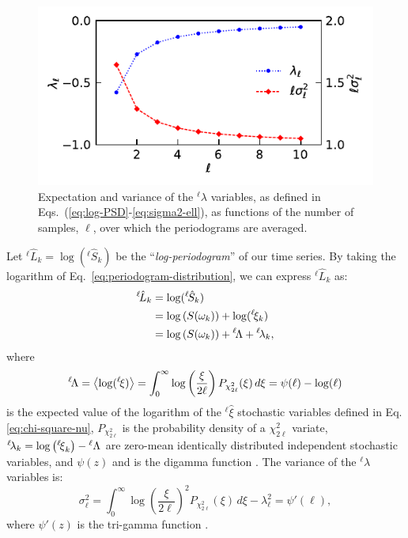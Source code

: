 \begin{figure}
    \centering
    \includegraphics[]{chapters/chapter5/figures/polygamma.pdf}
    \caption{Expectation and variance of the $^{\ell}\lambda$ variables, as defined in Eqs.~(\ref{eq:log-PSD}-\ref{eq:sigma2-ell}), as functions of the number of samples, $\ell$, over which the periodograms are averaged.}
    \label{fig:polygamma}
\end{figure}

Let $^{{\ell\!}}\hat{L}_{k} = \log(^{\ell\!}\hat{S}_{k})$ be the ``\emph{log-periodogram}'' of our time series. By taking the logarithm of Eq.~\eqref{eq:periodogram-distribution}, we can express $^{\ell\!}\hat{L}_{k}$ as:
\begin{align}
    ^{{\ell\!}}\hat{L}_{k} &= \log (^{\ell\!}\hat{S}_{k} ) \nonumber\\
    &= \log\left(S(\omega_k) \right) + \log( ^{\ell\!}{\xi}_k) \nonumber\\
    &= \log\left(S(\omega_k) \right) + {^{\ell\!}\rLambda} + {^{\ell\!}{\lambda}}_{k},  \label{eq:log-PSD}
\end{align}
where
\begin{equation}
    {^{\ell\!}\rLambda} = \left\langle \log( {^{\ell\!}{\xi}}) \right\rangle = \int_0^\infty \log\left (\frac{\xi}{2\ell}\right ) P_{\chi^2_{2\ell}}(\xi) \, d\xi = \psi(\ell)-\log(\ell) \label{eq:lambda-ell}
\end{equation}
is the expected value of the logarithm of the ${^\ell}\hat\xi$ stochastic variables defined in Eq. \eqref{eq:chi-square-nu}, $P_{\chi^2_{2\ell}}$ is the probability density of a $\chi^2_{2\ell}$ variate, $^{\ell\!}{\lambda}_k = \log\left( {^{\ell\!}{\xi}}_k\right) - {^\ell{{\mathrm\Lambda}}}$ are zero-mean identically distributed independent stochastic variables, and $\psi(z)$ and is the digamma function \cite{PolyGamma}. 
The variance of the $^{\ell\!}\lambda$ variables is:
\begin{equation}
    \sigma_{\ell}^{2} = \int_0^\infty \log\left (\frac{\xi}{2\ell}\right )^2 P_{\chi^2_{2\ell}}(\xi) \, d\xi - \lambda_{\ell}^2 =\psi'(\ell),\label{eq:sigma2-ell}
\end{equation}
where $\psi'(z)$ is the tri-gamma function \cite{PolyGamma}. 


